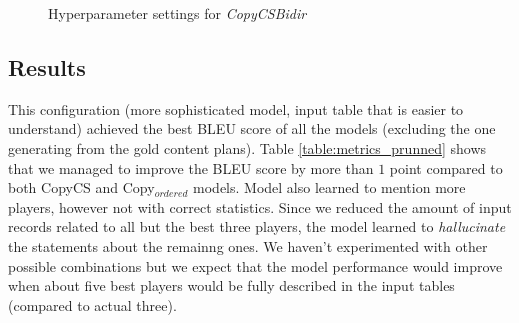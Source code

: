 \begin{figure}[h]
    \caption{Hyperparameter settings for \emph{CopyCSBidir}} \label{figure:hyperparameters_copy_prunned}
\end{figure}

\subsection{Results}

This configuration (more sophisticated model, input table that is easier to understand) achieved the best BLEU score of all the models (excluding the one generating from the gold content plans). Table \ref{table:metrics_prunned} shows that we managed to improve the BLEU score by more than $1$ point compared to both CopyCS and Copy$_{ordered}$ models. Model also learned to mention more players, however not with correct statistics. Since we reduced the amount of input records related to all but the best three players, the model learned to \emph{hallucinate} the statements about the remainng ones. We haven't experimented with other possible combinations but we expect that the model performance would improve when about five best players would be fully described in the input tables (compared to actual three).

